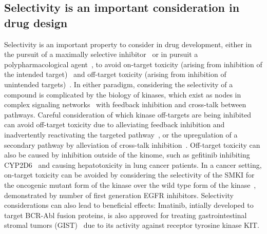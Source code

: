 \documentclass[phd,tocprelim]{cornell}
\begin{document}
\subsection{Selectivity is an important consideration in drug design}
Selectivity is an important property to consider in drug development, either in the pursuit of a maximally selective inhibitor~\citep{Zhang2009-il,Huggins2012-hr} or in pursuit a polypharmacological agent~\citep{Fan2007-hm,Apsel2008-it,Knight:Nat.Rev.Cancer:2010,Hopkins2006-qu,Hopkins2008-ij}, to avoid on-target toxicity (arising from inhibition of the intended target)~\citep{Rudmann2013-hi}  and off-target toxicity (arising from inhibition of unintended targets)~\citep{Kijima2011-xs,Liu2014-yi}. In either paradigm, considering the selectivity of a compound is complicated by the biology of kinases, which exist as nodes in complex signaling networks~\citep{Mendoza2011-bj,Tricker2015-xx} with feedback inhibition and cross-talk between pathways. Careful consideration of which kinase off-targets are being inhibited can avoid off-target toxicity due to alleviating feedback inhibition and inadvertently reactivating the targeted pathway~\citep{Mendoza2011-bj,Tricker2015-xx}, or the upregulation of a secondary pathway by alleviation of cross-talk inhibition~\citep{Bailey2014-pd,Chandarlapaty:CancerCell:2011}. Off-target toxicity can also be caused by inhibition outside of the kinome, such as gefitinib inhibiting CYP2D6~\citep{Kijima2011-xs} and causing hepatotoxicity in lung cancer patients. In a cancer setting, on-target toxicity can be avoided by considering the selectivity of the SMKI for the oncogenic mutant form of the kinase over the wild type form of the kinase~\citep{Pao2004-kx,Kim2012-mo,Juchum:DrugResist.Updat.:2015}, demonstrated by number of first generation EGFR inhibitors. Selectivity considerations can also lead to beneficial effects: Imatinib, intially developed to target BCR-Abl fusion proteins, is also approved for treating gastrointestinal stromal tumors (GIST)~\citep{Din2008-ag} due to its activity against receptor tyrosine kinase KIT. 
\end{document}
